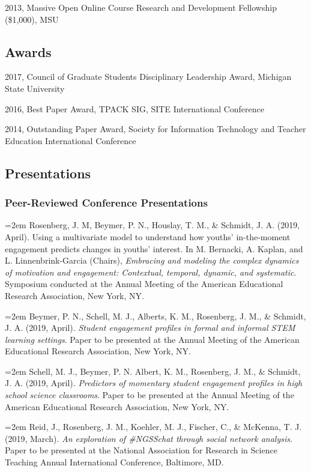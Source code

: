\documentclass[]{article}
\begin{document}
2013, Massive Open Online Course Research and Development Fellowship
(\$1,000), MSU

\subsection{Awards}\label{awards}

2017, Council of Graduate Students Disciplinary Leadership Award,
Michigan State University

2016, Best Paper Award, TPACK SIG, SITE International Conference

2014, Outstanding Paper Award, Society for Information Technology and
Teacher Education International Conference

\subsection{Presentations}\label{presentations}

\subsubsection{Peer-Reviewed Conference
Presentations}\label{peer-reviewed-conference-presentations}

\hangindent=2em Rosenberg, J. M, Beymer, P. N., Houslay, T. M., \&
Schmidt, J. A. (2019, April). Using a multivariate model to understand
how youths' in-the-moment engagement predicts changes in youths'
interest. In M. Bernacki, A. Kaplan, and L. Linnenbrink-Garcia (Chairs),
\emph{Embracing and modeling the complex dynamics of motivation and
engagement: Contextual, temporal, dynamic, and systematic}. Symposium
conducted at the Annual Meeting of the American Educational Research
Association, New York, NY.

\hangindent=2em Beymer, P. N., Schell, M. J., Alberts, K. M., Rosenberg,
J. M., \& Schmidt, J. A. (2019, April). \emph{Student engagement
profiles in formal and informal STEM learning settings}. Paper to be
presented at the Annual Meeting of the American Educational Research
Association, New York, NY.

\hangindent=2em Schell, M. J., Beymer, P. N. Albert, K. M., Rosenberg,
J. M., \& Schmidt, J. A. (2019, April). \emph{Predictors of momentary
student engagement profiles in high school science classrooms}. Paper to
be presented at the Annual Meeting of the American Educational Research
Association, New York, NY.

\hangindent=2em Reid, J., Rosenberg, J. M., Koehler, M. J., Fischer, C.,
\& McKenna, T. J. (2019, March). \emph{An exploration of \#NGSSchat
through social network analysis}. Paper to be presented at the National
Association for Research in Science Teaching Annual International
Conference, Baltimore, MD.
\end{document}
